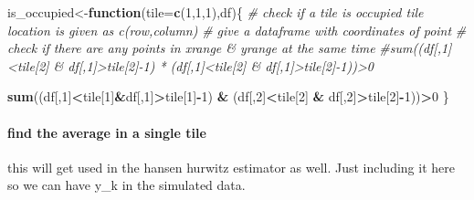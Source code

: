 \documentclass[
]{article}
\newenvironment{Shaded}{\begin{snugshade}}{\end{snugshade}}
\newcommand{\AttributeTok}[1]{\textcolor[rgb]{0.13,0.29,0.53}{#1}}
\newcommand{\CommentTok}[1]{\textcolor[rgb]{0.56,0.35,0.01}{\textit{#1}}}
\newcommand{\ControlFlowTok}[1]{\textcolor[rgb]{0.13,0.29,0.53}{\textbf{#1}}}
\newcommand{\DecValTok}[1]{\textcolor[rgb]{0.00,0.00,0.81}{#1}}
\newcommand{\FunctionTok}[1]{\textcolor[rgb]{0.13,0.29,0.53}{\textbf{#1}}}
\newcommand{\NormalTok}[1]{#1}
\newcommand{\OtherTok}[1]{\textcolor[rgb]{0.56,0.35,0.01}{#1}}
\newcommand{\SpecialCharTok}[1]{\textcolor[rgb]{0.81,0.36,0.00}{\textbf{#1}}}
\begin{document}
\begin{Shaded}
\begin{Highlighting}[]
\NormalTok{is\_occupied}\OtherTok{\textless{}{-}}\ControlFlowTok{function}\NormalTok{(}\AttributeTok{tile=}\FunctionTok{c}\NormalTok{(}\DecValTok{1}\NormalTok{,}\DecValTok{1}\NormalTok{,}\DecValTok{1}\NormalTok{),df)\{}
  \CommentTok{\# check if a tile is occupied tile location is given as c(row,column)}
  \CommentTok{\# give a dataframe with coordinates of point}
  \CommentTok{\# check if there are any points in xrange \& yrange at the same time}
  \CommentTok{\#sum((df[,1]\textless{}tile[2] \& df[,1]\textgreater{}tile[2]{-}1) * (df[,1]\textless{}tile[2] \& df[,1]\textgreater{}tile[2]{-}1))\textgreater{}0}
  
  \FunctionTok{sum}\NormalTok{((df[,}\DecValTok{1}\NormalTok{]}\SpecialCharTok{\textless{}}\NormalTok{tile[}\DecValTok{1}\NormalTok{]}\SpecialCharTok{\&}\NormalTok{df[,}\DecValTok{1}\NormalTok{]}\SpecialCharTok{\textgreater{}}\NormalTok{tile[}\DecValTok{1}\NormalTok{]}\SpecialCharTok{{-}}\DecValTok{1}\NormalTok{) }\SpecialCharTok{\&}\NormalTok{ (df[,}\DecValTok{2}\NormalTok{]}\SpecialCharTok{\textless{}}\NormalTok{tile[}\DecValTok{2}\NormalTok{] }\SpecialCharTok{\&}\NormalTok{ df[,}\DecValTok{2}\NormalTok{]}\SpecialCharTok{\textgreater{}}\NormalTok{tile[}\DecValTok{2}\NormalTok{]}\SpecialCharTok{{-}}\DecValTok{1}\NormalTok{))}\SpecialCharTok{\textgreater{}}\DecValTok{0}
\NormalTok{\}}
\end{Highlighting}
\end{Shaded}

\paragraph{find the average in a single
tile}\label{find-the-average-in-a-single-tile}

this will get used in the hansen hurwitz estimator as well. Just
including it here so we can have y\_k in the simulated data.
\end{document}
